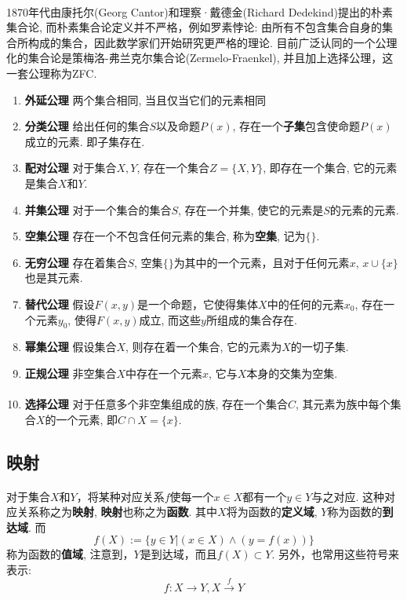 \paragraph{}
1870年代由康托尔(Georg Cantor)和理察·戴德金(Richard Dedekind)提出的朴素集合论, 而朴素集合论定义并不严格，例如罗素悖论: 由所有不包含集合自身的集合所构成的集合，因此数学家们开始研究更严格的理论.  目前广泛认同的一个公理化的集合论是策梅洛-弗兰克尔集合论(Zermelo-Fraenkel), 并且加上选择公理，这一套公理称为ZFC. 

\begin{enumerate}
\item \textbf{外延公理}  \: 两个集合相同, 当且仅当它们的元素相同
\item \textbf{分类公理}  \: 给出任何的集合$S$以及命题$P(x)$, 存在一个\textbf{子集}包含使命题$P(x)$成立的元素. 即子集存在.
\item \textbf{配对公理} \:  对于集合$X, Y$, 存在一个集合$Z = \{X, Y\}$, 即存在一个集合, 它的元素是集合$X$和$Y$.
\item \textbf{并集公理} \: 对于一个集合的集合$S$, 存在一个并集, 使它的元素是$S$的元素的元素.
\item \textbf{空集公理} \: 存在一个不包含任何元素的集合, 称为\textbf{空集}, 记为$\{\}$.
\item \textbf{无穷公理} \: 存在着集合$S$, 空集$\{\}$为其中的一个元素，且对于任何元素$x$, $x \cup \{x\}$也是其元素.
\item \textbf{替代公理} \: 假设$F(x, y)$是一个命题，它使得集体$X$中的任何的元素$x_0$, 存在一个元素$y_0$, 使得$F(x, y)$成立, 而这些$y$所组成的集合存在.
\item \textbf{幂集公理} \: 假设集合$X$, 则存在着一个集合, 它的元素为$X$的一切子集.
\item \textbf{正规公理} \: 非空集合$X$中存在一个元素$x$, 它与$X$本身的交集为空集. 
\paragraph{}
\item \textbf{选择公理} \: 对于任意多个非空集组成的族, 存在一个集合$C$, 其元素为族中每个集合$X$的一个元素, 即$C \cap X = \{x\}$. 
\end{enumerate}

\subsection{映射}
\paragraph{}
对于集合$X$和$Y$，将某种对应关系$f$使每一个$x \in X$都有一个$y \in Y$与之对应. 这种对应关系称之为\textbf{映射}, \textbf{映射}也称之为\textbf{函数}. 其中$X$将为函数的\textbf{定义域}, $Y$称为函数的\textbf{到达域}. 而
$$
f(X) := \{ y \in Y | (x \in X) \land (y = f(x)) \}
$$
称为函数的\textbf{值域}, 注意到，$Y$是到达域，而且$f(X) \subset Y$. 
另外，也常用这些符号来表示:
$$
f: X \to Y, X \stackrel{f}{\to} Y
$$


